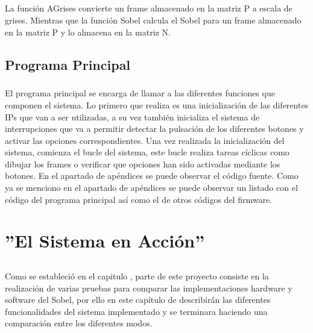 \documentclass[a4paper,12pt,titlepage,final]{book}
\begin{document}


\paragraph{}
La función AGrises convierte un frame almacenado en la matriz P a escala de grises. Mientras que la función Sobel calcula el Sobel para un frame almacenado en la matriz P y lo almacena en la matriz N. 


\section{Programa Principal}
\paragraph{}
El programa principal se encarga de llamar a las diferentes funciones que componen el sistema. Lo primero que realiza es una inicialización de las diferentes IPs que van a ser utilizadas, a su vez también inicializa el sistema de interrupciones que va a permitir detectar la pulsación de los diferentes botones y activar las opciones correspondientes. Una vez realizada la inicialización del sistema, comienza el bucle del sistema, este bucle realiza tareas cíclicas como dibujar los frames o verificar que opciones han sido activadas mediante los botones. En el apartado de apéndices se puede observar el código fuente. Como ya se menciono en el apartado de apéndices se puede observar un listado con el código del programa principal así como el de otros códigos del firmware.


\chapter{''El Sistema en Acción''}
\section*{}
\subsection*{}
\subsubsection*{}

\paragraph{}
Como se estableció en el capitulo , parte de este proyecto consiste en la realización de varias pruebas para comparar las implementaciones hardware y software del Sobel, por ello en este capítulo de describirán las diferentes funcionalidades del sistema implementado y se terminara haciendo una comparación entre los diferentes modos.
\end{document}
